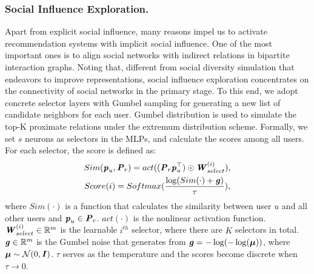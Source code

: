 \documentclass[letterpaper]{article} %
\begin{document}
\subsubsection{Social Influence Exploration.}
Apart from explicit social influence, many reasons impel us to activate recommendation systems with implicit social influence. One of the most important ones is to align social networks with indirect relations in bipartite interaction graphs. Noting that, different from social diversity simulation that endeavors to improve representations, social influence exploration concentrates on the connectivity of social networks in the primary stage. To this end, we adopt concrete selector layers with Gumbel sampling \cite{gumbel} for generating a new list of candidate neighbors for each user. Gumbel distribution is used to simulate the top-K proximate relations under the extremum distribution scheme. Formally, we set $s$ neurons as selectors in the MLPs, and calculate the scores among all users. For each selector, the score is defined as:
\begin{gather}
    Sim(\textbf{\textit{p}}_u,\textbf{\textit{P}}_r) = act((\textbf{\textit{P}}_r \textbf{\textit{p}}_u^{\top})\odot \textbf{\textit{W}}_{select}^{(i)}),\\
    Score(i) = Softmax(\frac{\log(Sim(\cdot)+\textbf{\textit{g}})}{\tau}),
\end{gather}
where $Sim(\cdot)$ is a function that calculates the similarity between user $u$ and all other users and $\textbf{\textit{p}}_u \in \textbf{\textit{P}}_r$. $act(\cdot)$ is the nonlinear activation function. $\textbf{\textit{W}}_{select}^{(i)} \in \mathbb{R}^m$ is the learnable $i^{th}$ selector, where there are $K$ selectors in total. $\textbf{\textit{g}} \in \mathbb{R}^{m}$ is the Gumbel noise that generates from $\textbf{\textit{g}}=-\log(-\log(\boldsymbol{\mu}))$, where $\boldsymbol{\mu} \sim \mathcal{N}(0,\textbf{\textit{I}})$. $\tau$ serves as the temperature and the scores become discrete when $\tau \rightarrow 0$.
\end{document}

